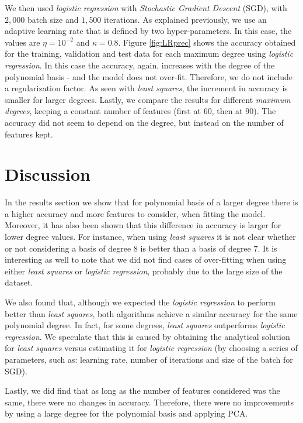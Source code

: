 \documentclass[10pt,conference,compsocconf]{IEEEtran}
\begin{document}
    We then used \textit{logistic regression} with \textit{Stochastic Gradient Descent} (SGD), with $2,000$ batch size and $1,500$ iterations. As explained previously, we use an adaptive learning rate that is defined by two hyper-parameters. In this case, the values are $\eta = 10^{-2}$ and $\kappa = 0.8$. Figure \ref{fig:LRprec} shows the accuracy obtained for the training, validation and test data for each maximum degree using \textit{logistic regression}.
    In this case the accuracy, again, increases with the degree of the polynomial basis - and the model does not over-fit. Therefore, we do not include a regularization factor. As seen with \textit{least squares}, the increment in accuracy is smaller for larger degrees. Lastly, we compare the results for different \emph{maximum degrees}, keeping a constant number of features (first at $60$, then at $90$). The accuracy did not seem to depend on the degree, but instead on the number of features kept.

\section{Discussion}
\label{sec:discussion}
  In the results section we show that for polynomial basis of a larger degree there is a higher accuracy and more features to consider, when fitting the model. Moreover, it has also been shown that this difference in accuracy is larger for lower degree values. For instance, when using \textit{least squares} it is not clear whether or not considering a basis of degree $8$ is better than a basis of degree $7$. It is interesting as well to note that we did not find cases of over-fitting when using either \textit{least squares} or \textit{logistic regression}, probably due to the large size of the dataset.

  We also found that, although we expected the \textit{logistic regression} to perform better than \textit{least squares}, both algorithms achieve a similar accuracy for the same polynomial degree. In fact, for some degrees, \textit{least squares} outperforms \textit{logistic regression}. We speculate that this is caused by obtaining the analytical solution for \textit{least squares} versus estimating it for \textit{logistic regression} (by choosing a series of parameters, such as: learning rate, number of iterations and size of the batch for SGD).

  Lastly, we did find that as long as the number of features considered was the same, there were no changes in accuracy. Therefore, there were no improvements by using a large degree for the polynomial basis and applying PCA.
\end{document}
